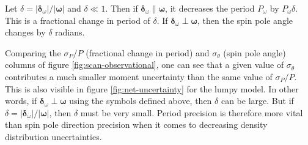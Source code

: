 Let $\delta = |\bm{\delta}_\omega| / |\bm \omega|$ and $\delta \ll 1$. Then if $\bm {\delta}_\omega \parallel \bm \omega$, it decreases the period $P_\omega$ by $P_\omega \delta$. This is a fractional change in period of $\delta$. If $\bm {\delta}_\omega \perp \bm \omega$, then the spin pole angle changes by $\delta$ radians.

Comparing the $\sigma_P / P$ (fractional change in period) and $\sigma_\theta$ (spin pole angle) columns of figure \ref{fig:scan-observational}, one can see that a given value of $\sigma_\theta$ contributes a much smaller moment uncertainty than the same value of $\sigma_P/ P$. This is also visible in figure \ref{fig:net-uncertainty} for the lumpy model. In other words, if $\bm {\delta}_\omega \perp \bm \omega$ using the symbols defined above, then $\delta$ can be large. But if $\delta = |\bm{\delta}_\omega| / |\bm \omega|$, then $\delta$ must be very small. Period precision is therefore more vital than spin pole direction precision when it comes to decreasing density distribution uncertainties.






